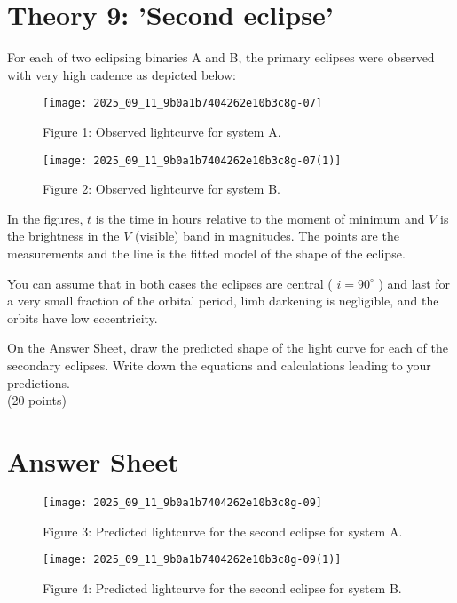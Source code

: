 \documentclass[10pt]{article}
\begin{document}
\section*{Theory 9: 'Second eclipse'}
For each of two eclipsing binaries A and B, the primary eclipses were observed with very high cadence as depicted below:

\begin{figure}[h]
\begin{center}
  \texttt{[image: 2025\_09\_11\_9b0a1b7404262e10b3c8g-07]}
\captionsetup{labelformat=empty}
\caption{Figure 1: Observed lightcurve for system A.}
\end{center}
\end{figure}

\begin{figure}[h]
\begin{center}
  \texttt{[image: 2025\_09\_11\_9b0a1b7404262e10b3c8g-07(1)]}
\captionsetup{labelformat=empty}
\caption{Figure 2: Observed lightcurve for system B.}
\end{center}
\end{figure}

In the figures, $t$ is the time in hours relative to the moment of minimum and $V$ is the brightness in the $V$ (visible) band in magnitudes. The points are the measurements and the line is the fitted model of the shape of the eclipse.

You can assume that in both cases the eclipses are central ( $i=90^{\circ}$ ) and last for a very small fraction of the orbital period, limb darkening is negligible, and the orbits have low eccentricity.

On the Answer Sheet, draw the predicted shape of the light curve for each of the secondary eclipses. Write down the equations and calculations leading to your predictions.\\
(20 points)

\section*{Answer Sheet}
\begin{figure}[h]
\begin{center}
  \texttt{[image: 2025\_09\_11\_9b0a1b7404262e10b3c8g-09]}
\captionsetup{labelformat=empty}
\caption{Figure 3: Predicted lightcurve for the second eclipse for system A.}
\end{center}
\end{figure}

\begin{figure}[h]
\begin{center}
  \texttt{[image: 2025\_09\_11\_9b0a1b7404262e10b3c8g-09(1)]}
\captionsetup{labelformat=empty}
\caption{Figure 4: Predicted lightcurve for the second eclipse for system B.}
\end{center}
\end{figure}
\end{document}
